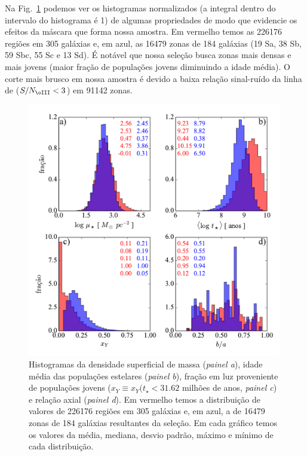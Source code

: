 Na Fig.\ \ref{fig:histosample} podemos ver os histogramas normalizados (a integral dentro do
intervalo do histograma é 1) de algumas propriedades de modo que evidencie os efeitos da máscara
que forma nossa amostra. Em vermelho temos as 226176 regiões em 305 galáxias e, em azul, as 16479
zonas de 184 galáxias (19 Sa, 38 Sb, 59 Sbc, 55 Sc e 13 Sd). É notável que nossa seleção busca zonas
mais densas e mais jovens (maior fração de populações jovens diminuindo a idade média). O corte mais
brusco em nossa amostra é devido a baixa relação sinal-ruído da linha de \oIII ($S/N_{\oIII} < 3$)
em 91142 zonas.
\begin{figure}
	\centering
	\includegraphics[width=0.99\textwidth]{figuras/histosample.pdf}
	\caption[Histogramas: densidade superficial de massa, idade média, fração de populações jovens e
	relação axial.] 
	{Histogramas da densidade superficial de massa ({\em painel a}), idade média das populações
estelares ({\em painel b}), fração em luz proveniente de populações jovens ($x_Y \equiv x_Y(t_\star <
31.62$ milhões de anos, {\em painel c}) e relação axial ({\em painel d}). Em vermelho temos a
distribuição de valores de 226176 regiões em 305 galáxias e, em azul, a de 16479 zonas de 184
galáxias resultantes da seleção. Em cada gráfico temos os valores da média, mediana, desvio padrão,
máximo e mínimo de cada distribuição.}
	\label{fig:histosample}
\end{figure}

